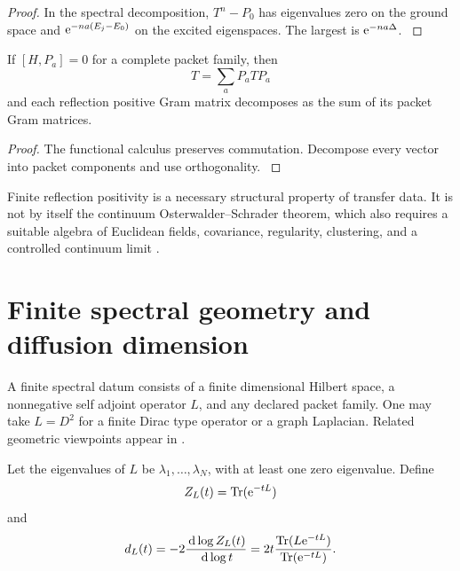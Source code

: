 \begin{proof}\label{strong:proof:060}
In the spectral decomposition, \(T^n-P_0\) has eigenvalues zero on the ground space and \(\e^{-na(E_j-E_0)}\) on the excited eigenspaces. The largest is \(\e^{-na\Delta}\).
\label{strong:proof:060:end}\end{proof}

\begin{proposition}\label{strong:proposition:008}\label{strong:prop:symmetry_transfer}
If \([H,P_a]=0\) for a complete packet family, then
\[
T=\sum_aP_aTP_a
\]
and each reflection positive Gram matrix decomposes as the sum of its packet Gram matrices.
\end{proposition}

\begin{proof}\label{strong:proof:061}
The functional calculus preserves commutation. Decompose every vector into packet components and use orthogonality.
\label{strong:proof:061:end}\end{proof}

Finite reflection positivity is a necessary structural property of transfer data. It is not by itself the continuum Osterwalder--Schrader theorem, which also requires a suitable algebra of Euclidean fields, covariance, regularity, clustering, and a controlled continuum limit \cite{OsterwalderSchrader1973,OsterwalderSchrader1975,GlimmJaffe1987}.

\section{Finite spectral geometry and diffusion dimension}\label{strong:section:011}\label{strong:sec:spectral_geometry}

A finite spectral datum consists of a finite dimensional Hilbert space, a nonnegative self adjoint operator \(L\), and any declared packet family. One may take \(L=D^2\) for a finite Dirac type operator or a graph Laplacian. Related geometric viewpoints appear in \cite{Connes1994,Vassilevich2003}.

\begin{definition}\label{strong:definition:008}\label{strong:def:spectral_dimension}
Let the eigenvalues of \(L\) be \(\lambda_1,\ldots,\lambda_N\), with at least one zero eigenvalue. Define
\[
Z_L(t)=\Tr(\e^{-tL})
\]
and
\[
d_L(t)
=-2\frac{\dd\log Z_L(t)}{\dd\log t}
=
2t
\frac{\Tr(L\e^{-tL})}{\Tr(\e^{-tL})}.
\]
\end{definition}

